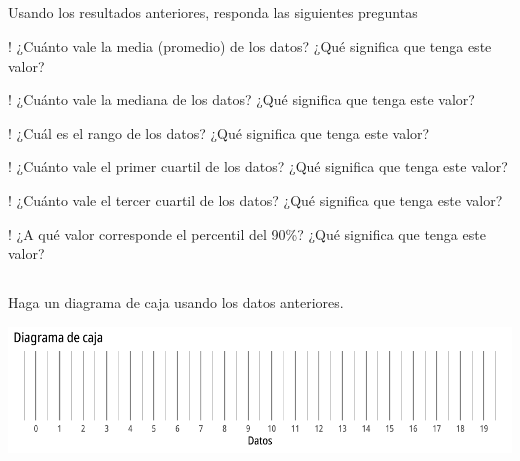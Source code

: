 \documentclass{cdplf-prueba}
\begin{document}
\subsection{}
Usando los resultados anteriores, responda las siguientes preguntas
\begin{tasks}[label={\tcbox[colback=black!60, colframe=black!60, coltext=white, on line, boxsep=0pt, left=3pt, right=3pt, top=2pt, bottom=2pt]{\sffamily\bfseries\alph*}},
item-indent=1.2cm,column-sep=20pt,label-offset=0.3cm,label-width=15pt,after-item-skip=10pt]
    \task! ¿Cuánto vale la media (promedio) de los datos? ¿Qué significa que tenga este valor? \begin{lineas}[height=1.5cm]\end{lineas}
    \task! ¿Cuánto vale la mediana de los datos? ¿Qué significa que tenga este valor? \begin{lineas}[height=1.5cm]\end{lineas}
    \task! ¿Cuál es el rango de los datos? ¿Qué significa que tenga este valor? \begin{lineas}[height=1.5cm]\end{lineas}
    \task! ¿Cuánto vale el primer cuartil de los datos? ¿Qué significa que tenga este valor? \begin{lineas}[height=1.5cm]\end{lineas}
    \task! ¿Cuánto vale el tercer cuartil de los datos? ¿Qué significa que tenga este valor? \begin{lineas}[height=1.5cm]\end{lineas}
    \task! ¿A qué valor corresponde el percentil del 90\%? ¿Qué significa que tenga este valor? \begin{lineas}[height=1.5cm]\end{lineas}
\end{tasks}
\subsection{}

Haga un diagrama de caja usando los datos anteriores.
\begin{center}\includegraphics{diagrama_caja_vacio_5.pdf}\end{center}
\end{document}
